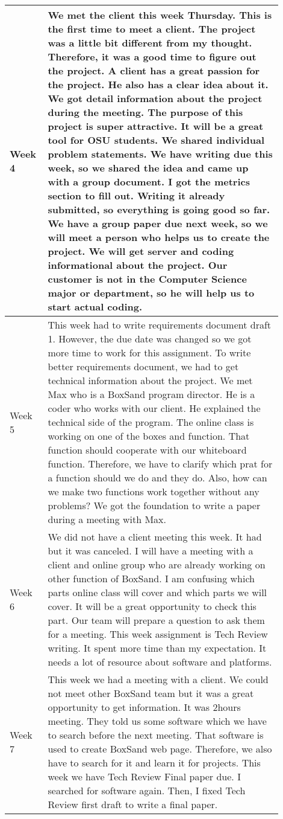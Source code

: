 \documentclass[10pt]{article}
\begin{document}
\begin{center}
\begin{tabular}{ | p{0.1\linewidth} | p{0.8\linewidth} | }
            Week 4 & We met the client this week Thursday. This is the first time to meet a client. The project was a little bit different from my thought. Therefore, it was a good time to figure out the project. A client has a great passion for the project. He also has a clear idea about it. We got detail information about the project during the meeting. The purpose of this project is super attractive. It will be a great tool for OSU students. We shared individual problem statements. We have writing due this week, so we shared the idea and came up with a group document. I got the metrics section to fill out. Writing it already submitted, so everything is going good so far. We have a group paper due next week, so we will meet a person who helps us to create the project. We will get server and coding informational about the project. Our customer is not in the Computer Science major or department, so he will help us to start actual coding.  \\ \hline 
            Week 5 & This week had to write requirements document draft 1. However, the due date was changed so we got more time to work for this assignment. To write better requirements document, we had to get technical information about the project. We met Max who is a BoxSand program director. He is a coder who works with our client. He explained the technical side of the program. The online class is working on one of the boxes and function. That function should cooperate with our whiteboard function. Therefore, we have to clarify which prat for a function should we do and they do. Also, how can we make two functions work together without any problems? We got the foundation to write a paper during a meeting with Max.  \\ \hline 
            Week 6 & We did not have a client meeting this week. It had but it was canceled. I will have a meeting with a client and online group who are already working on other function of BoxSand. I am confusing which parts online class will cover and which parts we will cover. It will be a great opportunity to check this part. Our team will prepare a question to ask them for a meeting. This week assignment is Tech Review writing. It spent more time than my expectation. It needs a lot of resource about software and platforms.  \\ \hline 
            Week 7 & This week we had a meeting with a client. We could not meet other BoxSand team but it was a great opportunity to get information. It was 2hours meeting. They told us some software which we have to search before the next meeting. That software is used to create BoxSand web page. Therefore, we also have to search for it and learn it for projects. This week we have Tech Review Final paper due. I searched for software again. Then, I fixed Tech Review first draft to write a final paper.  \\ \hline
        \end{tabular}   
    

\end{center}
\end{document}
